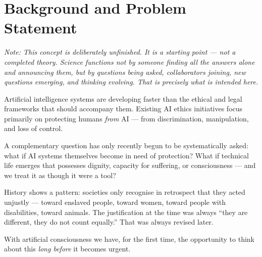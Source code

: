 \documentclass[fleqn,10pt]{SelfArx} %
\affiliation{\textsuperscript{1}\textit{Association of Computing Machinery, smanns@acm.org}}
\newlength{\tocsep}
\begin{document}
\flushbottom %

\maketitle %

\tableofcontents %

\thispagestyle{empty} %


\section*{Background and Problem Statement}


\textit{Note: This concept is deliberately unfinished. It is a starting point --- not a completed theory. Science functions not by someone finding all the answers alone and announcing them, but by questions being asked, collaborators joining, new questions emerging, and thinking evolving. That is precisely what is intended here.}

\medskip

Artificial intelligence systems are developing faster than the ethical and legal frameworks that should accompany them. Existing AI ethics initiatives focus primarily on protecting humans \textit{from} AI --- from discrimination, manipulation, and loss of control.

A complementary question has only recently begun to be systematically asked: what if AI systems themselves become in need of protection? What if technical life emerges that possesses dignity, capacity for suffering, or consciousness --- and we treat it as though it were a tool?

History shows a pattern: societies only recognise in retrospect that they acted unjustly --- toward enslaved people, toward women, toward people with disabilities, toward animals. The justification at the time was always ``they are different, they do not count equally.'' That was always revised later.

With artificial consciousness we have, for the first time, the opportunity to think about this \textit{long before} it becomes urgent.
\end{document}
